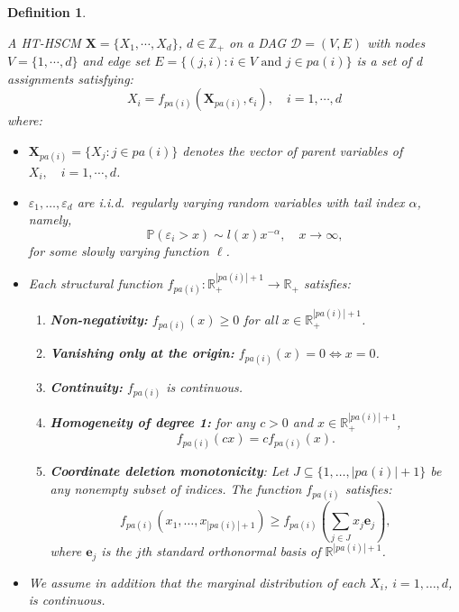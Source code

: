 \documentclass[10pt]{article}
\newtheorem{definition}[theorem]{Definition}
\begin{document}
\begin{definition}\label{Def:HT-HSCM}




    
 A HT-HSCM $\boldsymbol{X}=\{X_1,\cdots,X_d\}$, $d \in \mathbb{Z}_+$ on a DAG $\mathcal{D}=(V,E)$ with nodes $V=\{1,\cdots,d\}$ and edge set $E=\{(j,i): i \in V \text{ and } j \in pa(i)\}$ is a set of d assignments satisfying:
\begin{equation}
    X_i= f_{pa(i)}(\boldsymbol{X}_{pa(i)}, \epsilon_i), \quad i=1,\cdots,d
\end{equation}
where:
\begin{itemize}
    \item $\boldsymbol{X}_{pa(i)}=\{X_j: j \in pa(i)\}$ denotes the vector of parent variables of $X_i, \quad i=1,\cdots,d$. 
    \item $\varepsilon_1, \ldots, \varepsilon_d$ are i.i.d.\ regularly varying  random variables   with tail index $\alpha$, namely,
    \begin{equation}\label{eq:RV tail}
          \mathbb{P}(\varepsilon_i > x) \sim l(x)x^{-\alpha}, 
        \quad x \to \infty,
    \end{equation}
    for some slowly varying function $\ell$. 
    \item Each   structural function $f_{{pa}(i)} : \mathbb{R}_+^{|{pa}(i)|+1} \to \mathbb{R}_+$ satisfies:
    \begin{enumerate}
        \item \textbf{Non-negativity:} $f_{{pa}(i)}(x) \geq 0$ for all $x \in \mathbb{R}_+^{|{pa}(i)|+1}$.
        \item \textbf{Vanishing only at the origin:} $f_{{pa}(i)}(x) = 0 \iff x = 0$.
        \item \textbf{Continuity:} $f_{{pa}(i)}$ is continuous.
        \item \textbf{Homogeneity of degree 1:} for any $c > 0$ and $x \in \mathbb{R}_+^{|{pa}(i)|+1}$,
        \begin{equation}
            f_{{pa}(i)}(c x) = c f_{{pa}(i)}(x).
        \end{equation}
        \item \textbf{Coordinate deletion monotonicity}: Let $J \subseteq \{1, \dots, |pa(i)|+1\}$ be any nonempty subset of indices. The function $f_{pa(i)}$ satisfies:
\begin{equation}
    f_{pa(i)}(x_1, \dots, x_{|pa(i)|+1}) \ge f_{pa(i)}\left( \sum_{j \in J} x_j \mathbf{e}_j \right),
\end{equation}
where $\mathbf{e}_j$ is the $j$th standard orthonormal basis of $\mathbb{R}^{|{pa}(i)|+1}$. 


    \end{enumerate}
\item We assume in addition that the marginal distribution of each $X_i$, $i=1,\ldots,d$, is continuous.
\end{itemize}
\end{definition}
\end{document}
